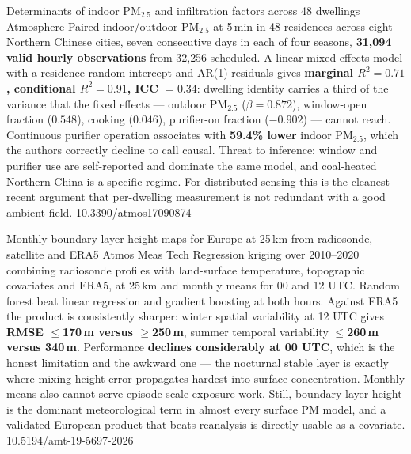 \documentclass[10pt]{article}
\begin{document}
{Determinants of indoor PM$_{2.5}$ and infiltration factors across 48 dwellings}
{Atmosphere}
{Paired indoor/outdoor PM$_{2.5}$ at 5\,min in 48 residences across eight Northern Chinese
cities, seven consecutive days in each of four seasons, \textbf{31{,}094 valid hourly
observations} from 32{,}256 scheduled. A linear mixed-effects model with a residence random
intercept and AR(1) residuals gives \textbf{marginal $R^2=0.71$, conditional $R^2=0.91$,
ICC $=0.34$}: dwelling identity carries a third of the variance that the fixed effects ---
outdoor PM$_{2.5}$ ($\beta=0.872$), window-open fraction ($0.548$), cooking ($0.046$),
purifier-on fraction ($-0.902$) --- cannot reach. Continuous purifier operation associates
with \textbf{59.4\% lower} indoor PM$_{2.5}$, which the authors correctly decline to call
causal. Threat to inference: window and purifier use are self-reported and dominate the same
model, and coal-heated Northern China is a specific regime. For distributed sensing this is
the cleanest recent argument that per-dwelling measurement is not redundant with a good
ambient field.}
{10.3390/atmos17090874}

{Monthly boundary-layer height maps for Europe at 25\,km from radiosonde, satellite and ERA5}
{Atmos Meas Tech}
{Regression kriging over 2010--2020 combining radiosonde profiles with land-surface
temperature, topographic covariates and ERA5, at 25\,km and monthly means for 00 and 12 UTC.
Random forest beat linear regression and gradient boosting at both hours. Against ERA5 the
product is consistently sharper: winter spatial variability at 12 UTC gives
\textbf{RMSE $\leq$170\,m versus $\geq$250\,m}, summer temporal variability
\textbf{$\leq$260\,m versus 340\,m}. Performance \textbf{declines considerably at 00 UTC},
which is the honest limitation and the awkward one --- the nocturnal stable layer is exactly
where mixing-height error propagates hardest into surface concentration. Monthly means also
cannot serve episode-scale exposure work. Still, boundary-layer height is the dominant
meteorological term in almost every surface PM model, and a validated European product that
beats reanalysis is directly usable as a covariate.}
{10.5194/amt-19-5697-2026}
\end{document}
